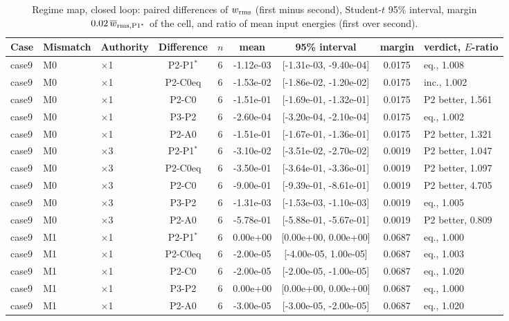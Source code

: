 {\small\setlength{\tabcolsep}{3.5pt}
\begin{longtable}{lllcccccl}
\caption{Regime map, closed loop: paired differences of $w_{\rm rms}$ (first minus second), Student-$t$ 95\% interval, margin $0.02\,\overline{w}_{\rm rms,P1^*}$ of the cell, and ratio of mean input energies (first over second).}\label{tab:S:regclp}\\
\toprule
Case & Mismatch & Authority & Difference & $n$ & mean & 95\% interval & margin & verdict, $E$-ratio\\
\midrule
\endfirsthead
case9 & M0 & $\times$1 & P2-P1$^*$ & 6 & -1.12e-03 & [-1.31e-03, -9.40e-04] & 0.0175 & eq., 1.008\\
case9 & M0 & $\times$1 & P2-C0eq & 6 & -1.53e-02 & [-1.86e-02, -1.20e-02] & 0.0175 & inc., 1.002\\
case9 & M0 & $\times$1 & P2-C0 & 6 & -1.51e-01 & [-1.69e-01, -1.32e-01] & 0.0175 & P2 better, 1.561\\
case9 & M0 & $\times$1 & P3-P2 & 6 & -2.60e-04 & [-3.20e-04, -2.10e-04] & 0.0175 & eq., 1.002\\
case9 & M0 & $\times$1 & P2-A0 & 6 & -1.51e-01 & [-1.67e-01, -1.36e-01] & 0.0175 & P2 better, 1.321\\
case9 & M0 & $\times$3 & P2-P1$^*$ & 6 & -3.10e-02 & [-3.51e-02, -2.70e-02] & 0.0019 & P2 better, 1.047\\
case9 & M0 & $\times$3 & P2-C0eq & 6 & -3.50e-01 & [-3.64e-01, -3.36e-01] & 0.0019 & P2 better, 1.097\\
case9 & M0 & $\times$3 & P2-C0 & 6 & -9.00e-01 & [-9.39e-01, -8.61e-01] & 0.0019 & P2 better, 4.705\\
case9 & M0 & $\times$3 & P3-P2 & 6 & -1.31e-03 & [-1.53e-03, -1.10e-03] & 0.0019 & eq., 1.005\\
case9 & M0 & $\times$3 & P2-A0 & 6 & -5.78e-01 & [-5.88e-01, -5.67e-01] & 0.0019 & P2 better, 0.809\\
case9 & M1 & $\times$1 & P2-P1$^*$ & 6 & 0.00e+00 & [0.00e+00, 0.00e+00] & 0.0687 & eq., 1.000\\
case9 & M1 & $\times$1 & P2-C0eq & 6 & -2.00e-05 & [-4.00e-05, 1.00e-05] & 0.0687 & eq., 1.003\\
case9 & M1 & $\times$1 & P2-C0 & 6 & -2.00e-05 & [-2.00e-05, -1.00e-05] & 0.0687 & eq., 1.020\\
case9 & M1 & $\times$1 & P3-P2 & 6 & 0.00e+00 & [0.00e+00, 0.00e+00] & 0.0687 & eq., 1.000\\
case9 & M1 & $\times$1 & P2-A0 & 6 & -3.00e-05 & [-3.00e-05, -2.00e-05] & 0.0687 & eq., 1.020\\

\end{longtable}}
